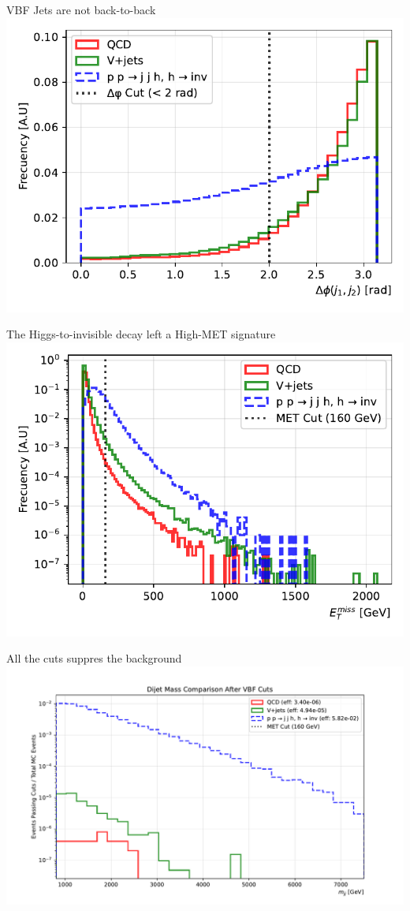 \documentclass{../../bredelebeamer}
\begin{document}
\begin{frame}{VBF Jets are not back-to-back}
    \includegraphics[width=\textwidth]{../Images/delta_phi_comparison.pdf}
\end{frame}

\begin{frame}{The Higgs-to-invisible decay left a High-MET signature}
    \includegraphics[width=\textwidth]{../Images/met_comparison.pdf}
\end{frame}

\begin{frame}{All the cuts suppres the background}
    \includegraphics[width=1.1\textwidth]{../Images/met_comparison_after_vbf_cuts.pdf}
\end{frame}
\end{document}
